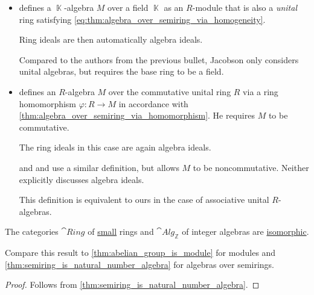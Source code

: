 \begin{remark}
\begin{thmenum}
\begin{itemize}
      Neither specifically discusses algebra ideals.

      \item \Textcite[407]{Jacobson1985BasicAlgebraI} defines a \( \BbbK \)-algebra \( M \) over a field \( \BbbK \) as an \( R \)-module that is also a \emph{unital} ring satisfying \eqref{eq:thm:algebra_over_semiring_via_homogeneity}.

      Ring ideals are then automatically algebra ideals.

      Compared to the authors from the previous bullet, Jacobson only considers unital algebras, but requires the base ring to be a field.

      \item \Textcite[13]{Eisenbud1995CommutativeAlgebra} defines an \( R \)-algebra \( M \) over the commutative unital ring \( R \) via a ring homomorphism \( \varphi: R \to M \) in accordance with \cref{thm:algebra_over_semiring_via_homomorphism}. He requires \( M \) to be commutative.

      The ring ideals in this case are again algebra ideals.

      \Textcite[def. III.5.7]{Aluffi2009Algebra} and \textcite[9]{Kaplansky1974CommutativeRings} and use a similar definition, but allows \( M \) to be noncommutative. Neither explicitly discusses algebra ideals.

      This definition is equivalent to ours in the case of associative unital \( R \)-algebras.
    \end{itemize}
  \end{thmenum}
\end{remark}

\begin{proposition}\label{thm:ring_is_integer_algebra}
  The categories \( \hyperref[def:ring/category]{\cat{Ring}} \) of \hyperref[def:small_set]{small} rings and \( \hyperref[def:algebra_over_ring/category]{\cat{Alg}_\BbbZ} \) of integer algebras are \hyperref[def:isomorphism_of_categories]{isomorphic}.
\end{proposition}
\begin{comments}
  \item Compare this result to \cref{thm:abelian_group_is_module} for modules and \cref{thm:semiring_is_natural_number_algebra} for algebras over semirings.
\end{comments}
\begin{proof}
  Follows from \cref{thm:semiring_is_natural_number_algebra}.
\end{proof}

